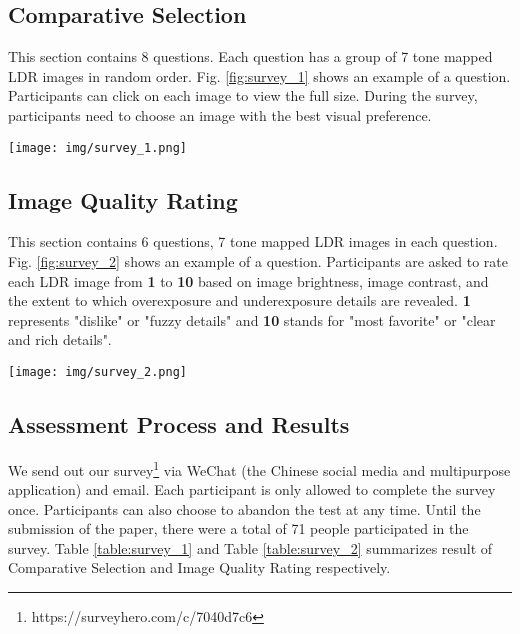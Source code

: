 \documentclass[journal]{IEEEtran}
\begin{document}



\clearpage
\appendix

\subsection{Comparative Selection}
This section contains 8 questions.  Each question has a group of 7 tone mapped LDR images in random order.  Fig. \ref{fig:survey_1} shows an example of a question.  Participants can click on each image to view the full size. During the survey, participants need to choose an image with the best visual preference.

\begin{figure*}[!h]
    \centering
    \texttt{[image: img/survey\_1.png]}
    \label{fig:survey_1}
\end{figure*}%

\subsection{Image Quality Rating}
This section contains 6 questions, 7 tone mapped LDR images in each question.  Fig. \ref{fig:survey_2} shows an example of a question. Participants are asked to rate each LDR image from \textbf{1} to \textbf{10} based on image brightness, image contrast, and the extent to which overexposure and underexposure details are revealed. \textbf{1} represents "dislike" or "fuzzy details" and \textbf{10} stands for "most favorite" or "clear and rich details".  

\begin{figure*}[!b]
    \centering
    \texttt{[image: img/survey\_2.png]}
    \label{fig:survey_2}
\end{figure*}%
\subsection{Assessment Process and Results}
We send out our survey\footnote{https://surveyhero.com/c/7040d7c6} via WeChat (the Chinese social media and multipurpose application) and email. Each participant is only allowed to complete the survey once. Participants can also choose to abandon the test at any time. Until the submission of the paper, there were a total of 71 people participated in the survey.  Table \ref{table:survey_1} and Table \ref{table:survey_2} summarizes result of Comparative Selection and Image Quality Rating respectively.
\end{document}
